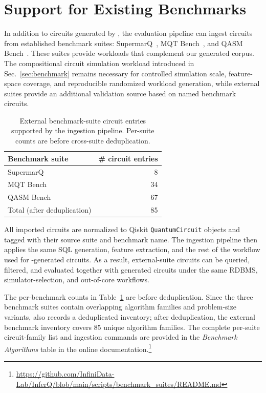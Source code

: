 \section{Support for Existing Benchmarks}
\label{app:benchmark-suites}

In addition to circuits generated by \sys, the evaluation pipeline can ingest circuits
from established benchmark suites: SupermarQ~\cite{tomesh2022supermarqscalablequantumbenchmark},
MQT Bench~\cite{Quetschlich_2023}, and QASM
Bench~\cite{li2022qasmbenchlowlevelqasmbenchmark}. These suites provide workloads that complement our generated corpus. The compositional circuit simulation workload introduced in Sec.~\ref{sec:benchmark}
remains necessary for controlled simulation scale, feature-space coverage, and reproducible
randomized workload generation, while external suites provide an additional validation
source based on named benchmark circuits.

\begin{table}[t]
  \centering
  \caption{External benchmark-suite circuit entries supported by the \sys ingestion pipeline. Per-suite counts are before cross-suite deduplication.}
  \label{tab:benchmark-suite-ingestion}
  \footnotesize
  \begin{tabular}{@{}lr@{}}
    \toprule
    \textbf{Benchmark suite} & \textbf{\# circuit entries} \\
    \midrule
    SupermarQ & 8 \\
    MQT Bench & 34 \\
    QASM Bench & 67 \\
    \midrule
    Total (after deduplication) & 85 \\
    \bottomrule
  \end{tabular}
\end{table}

All imported circuits are normalized to Qiskit \texttt{QuantumCircuit} objects and
tagged with their source suite and benchmark name. The ingestion pipeline then applies
the same SQL generation, feature extraction, and the rest of the workflow used for \sys-generated
circuits. As a result, external-suite circuits can be queried, filtered, and evaluated
together with generated circuits under the same RDBMS, simulator-selection, and
out-of-core workflows.

The per-benchmark counts in Table~\ref{tab:benchmark-suite-ingestion} are before deduplication. Since
the three benchmark suites contain overlapping algorithm families and problem-size variants, \sys
also records a deduplicated inventory; after deduplication, the external benchmark
inventory covers 85 unique algorithm families. The complete per-suite circuit-family
list and ingestion commands are provided in the \emph{Benchmark Algorithms} table in the online documentation.\footnote{\url{https://github.com/InfiniData-Lab/InferQ/blob/main/scripts/benchmark_suites/README.md}}

